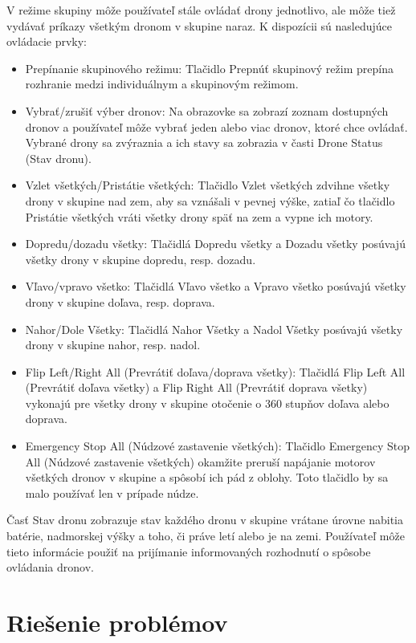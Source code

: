 \documentclass[a4paper]{feidippp}
\begin{document}
V režime skupiny môže používateľ stále ovládať drony jednotlivo, ale môže tiež vydávať príkazy všetkým dronom v skupine naraz. K dispozícii sú nasledujúce ovládacie prvky:

\begin{itemize}
\item Prepínanie skupinového režimu: Tlačidlo Prepnúť skupinový režim prepína rozhranie medzi individuálnym a skupinovým režimom.
\item Vybrať/zrušiť výber dronov: Na obrazovke sa zobrazí zoznam dostupných dronov a používateľ môže vybrať jeden alebo viac dronov, ktoré chce ovládať. Vybrané drony sa zvýraznia a ich stavy sa zobrazia v časti Drone Status (Stav dronu).
\item Vzlet všetkých/Pristátie všetkých: Tlačidlo Vzlet všetkých zdvihne všetky drony v skupine nad zem, aby sa vznášali v pevnej výške, zatiaľ čo tlačidlo Pristátie všetkých vráti všetky drony späť na zem a vypne ich motory.
\item Dopredu/dozadu všetky: Tlačidlá Dopredu všetky a Dozadu všetky posúvajú všetky drony v skupine dopredu, resp. dozadu.
\item Vľavo/vpravo všetko: Tlačidlá Vľavo všetko a Vpravo všetko posúvajú všetky drony v skupine doľava, resp. doprava.
\item Nahor/Dole Všetky: Tlačidlá Nahor Všetky a Nadol Všetky posúvajú všetky drony v skupine nahor, resp. nadol.
\item Flip Left/Right All (Prevrátiť doľava/doprava všetky): Tlačidlá Flip Left All (Prevrátiť doľava všetky) a Flip Right All (Prevrátiť doprava všetky) vykonajú pre všetky drony v skupine otočenie o 360 stupňov doľava alebo doprava.
\item Emergency Stop All (Núdzové zastavenie všetkých): Tlačidlo Emergency Stop All (Núdzové zastavenie všetkých) okamžite preruší napájanie motorov všetkých dronov v skupine a spôsobí ich pád z oblohy. Toto tlačidlo by sa malo používať len v prípade núdze.
\end{itemize}

Časť Stav dronu zobrazuje stav každého dronu v skupine vrátane úrovne nabitia batérie, nadmorskej výšky a toho, či práve letí alebo je na zemi. Používateľ môže tieto informácie použiť na prijímanie informovaných rozhodnutí o spôsobe ovládania dronov.

\newpage
\section{Riešenie problémov}
\end{document}
